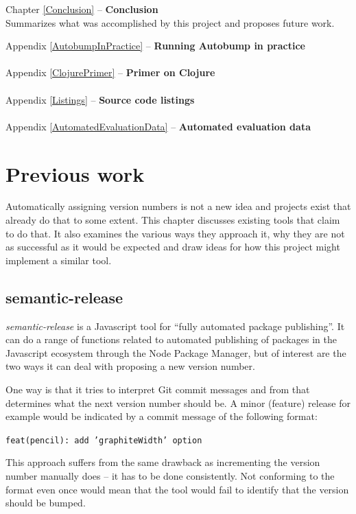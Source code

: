 \documentclass{l4proj}
\begin{document}
\noindent Chapter \ref{Conclusion} -- \textbf{Conclusion} \\
Summarizes what was accomplished by this project and proposes future work.

\noindent Appendix \ref{AutobumpInPractice} -- \textbf{Running
Autobump in practice} \\\\
\noindent Appendix \ref{ClojurePrimer} -- \textbf{Primer on Clojure} \\\\
\noindent Appendix \ref{Listings} -- \textbf{Source code listings} \\\\
\noindent Appendix \ref{AutomatedEvaluationData} -- \textbf{Automated
evaluation data}

\chapter{Previous work}
\label{PreviousWork}

Automatically assigning version numbers is not a new idea and projects
exist that already do that to some extent.
This chapter discusses existing tools that claim to do that. It also
examines the various ways they approach it, why they are not as
successful as it would be expected and draw ideas for how this project
might implement a similar tool.

\section{semantic-release}

\textit{semantic-release} \cite{SemanticRelease} is a Javascript tool
for ``fully automated package publishing''. It can do a range of
functions related to automated publishing of packages in the
Javascript ecosystem through the Node Package Manager, but of interest
are the two ways it can deal with proposing a new version number.

One way is that it tries to interpret Git commit messages and from
that determines what the next version number should be. A minor
(feature) release for example would be indicated by a commit message
of the following format:

\begin{center}
\texttt{feat(pencil): add 'graphiteWidth' option}
\end{center}

This approach suffers from the same drawback as incrementing the
version number manually does -- it has to be done consistently.
Not conforming to the format even once would mean that the tool would
fail to identify that the version should be bumped.
\end{document}
